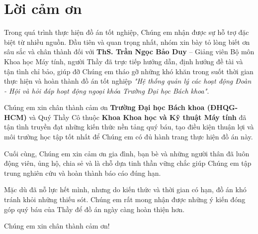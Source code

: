 \section*{Lời cảm ơn}
\thispagestyle{frontmatter}

\hspace{1.5em}Trong quá trình thực hiện đồ án tốt nghiệp, Chúng em nhận được sự hỗ trợ đặc biệt từ nhiều nguồn. 
Đầu tiên và quan trọng nhất, nhóm xin bày tỏ lòng biết ơn sâu sắc và chân thành đối với \textbf{ThS. Trần Ngọc Bảo Duy} -- Giảng viên Bộ môn Khoa học Máy tính, người Thầy đã trực tiếp hướng dẫn, định hướng đề tài và tận tình chỉ bảo, giúp đỡ Chúng em tháo gỡ những khó khăn trong suốt thời gian thực hiện và hoàn thành đồ án tốt nghiệp \textit{"Hệ thống quản lý các hoạt động Đoàn - Hội và hỏi đáp hoạt động ngoại khóa Trường Đại học Bách khoa"}.

Chúng em xin chân thành cảm ơn \textbf{Trường Đại học Bách khoa (ĐHQG-HCM)} và Quý Thầy Cô thuộc \textbf{Khoa Khoa học và Kỹ thuật Máy tính} đã tận tình truyền đạt những kiến thức nền tảng quý báu, tạo điều kiện thuận lợi và môi trường học tập tốt nhất để Chúng em có đủ hành trang thực hiện đồ án này.

Cuối cùng, Chúng em xin cảm ơn gia đình, bạn bè và những người thân đã luôn động viên, ủng hộ, chia sẻ và là chỗ dựa tinh thần vững chắc giúp Chúng em tập trung nghiên cứu và hoàn thành báo cáo đúng hạn.

Mặc dù đã nỗ lực hết mình, nhưng do kiến thức và thời gian có hạn, đồ án khó tránh khỏi những thiếu sót. Chúng em rất mong nhận được những ý kiến đóng góp quý báu của Thầy để đồ án ngày càng hoàn thiện hơn.

Chúng em xin chân thành cảm ơn!

\vspace{2cm}

\clearpage

